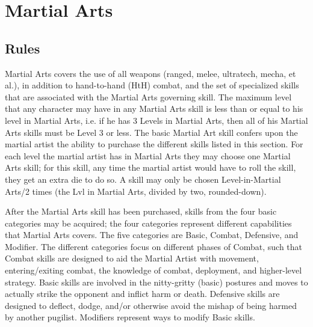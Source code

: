\documentclass[twoside]{book}
\begin{document}
    

\chapter{Martial Arts}
    
    

\section{Rules}
      Martial Arts covers the use of all weapons (ranged,
             melee, ultratech, mecha, et al.), in addition to
             hand-to-hand (HtH) combat, and the set of specialized skills
             that are associated with the Martial Arts governing skill.
             The maximum level that any character may have in any Martial
             Arts skill is less than or equal to his level in Martial
             Arts, i.e. if he has 3 Levels in Martial Arts, then all of
             his Martial Arts skills must be Level 3 or less. The basic
             Martial Art skill confers upon the martial artist the
             ability to purchase the different skills listed in this
             section.   For each level the martial artist has in Martial Arts
             they may choose one Martial Arts skill; for this skill, any
             time the martial artist would have to roll the skill, they
             get an extra die to do so. A skill may only be chosen
             Level-in-Martial Arts/2 times (the Lvl in Martial Arts,
             divided by two, rounded-down). 
  

  

    After the Martial Arts skill has been purchased,
             skills from the four basic categories may be acquired; the
             four categories represent different capabilities that
             Martial Arts covers. The five categories are Basic, Combat,
             Defensive, and Modifier. The different categories focus on
             different phases of Combat, such that Combat skills are
             designed to aid the Martial Artist with movement,
             entering/exiting combat, the knowledge of combat,
             deployment, and higher-level strategy. Basic skills are
             involved in the nitty-gritty (basic) postures and moves to
             actually strike the opponent and inflict harm or death.
             Defensive skills are designed to deflect, dodge, and/or
             otherwise avoid the mishap of being harmed by another
             pugilist. Modifiers represent ways to modify Basic skills.
             
\end{document}
